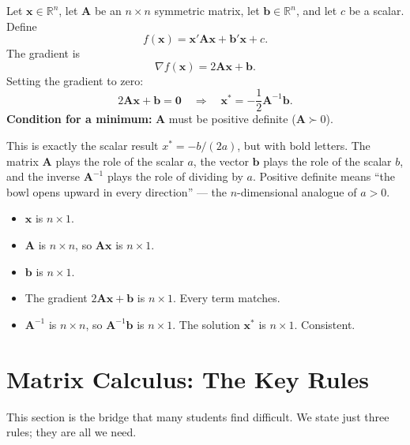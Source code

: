 \documentclass[11pt,a4paper]{article}
\begin{document}
\begin{formaldef}
Let $\bm{x} \in \mathbb{R}^n$, let $\bm{A}$ be an $n \times n$ symmetric matrix, let $\bm{b} \in \mathbb{R}^n$, and let $c$ be a scalar. Define
\[
f(\bm{x}) = \bm{x}'\bm{A}\bm{x} + \bm{b}'\bm{x} + c.
\]
The gradient is
\[
\nabla f(\bm{x}) = 2\bm{A}\bm{x} + \bm{b}.
\]
Setting the gradient to zero:
\[
2\bm{A}\bm{x} + \bm{b} = \bm{0} \quad \Longrightarrow \quad \bm{x}^* = -\frac{1}{2}\bm{A}^{-1}\bm{b}.
\]
\textbf{Condition for a minimum:} $\bm{A}$ must be positive definite ($\bm{A} \succ 0$).
\end{formaldef}

\begin{intuition}
This is exactly the scalar result $x^* = -b/(2a)$, but with bold letters. The matrix $\bm{A}$ plays the role of the scalar $a$, the vector $\bm{b}$ plays the role of the scalar $b$, and the inverse $\bm{A}^{-1}$ plays the role of dividing by $a$. Positive definite means ``the bowl opens upward in every direction'' --- the $n$-dimensional analogue of $a > 0$.
\end{intuition}

\begin{dimcheck}
\begin{itemize}[nosep]
\item $\bm{x}$ is $n \times 1$.
\item $\bm{A}$ is $n \times n$, so $\bm{A}\bm{x}$ is $n \times 1$.
\item $\bm{b}$ is $n \times 1$.
\item The gradient $2\bm{A}\bm{x} + \bm{b}$ is $n \times 1$. Every term matches.
\item $\bm{A}^{-1}$ is $n \times n$, so $\bm{A}^{-1}\bm{b}$ is $n \times 1$. The solution $\bm{x}^*$ is $n \times 1$. Consistent.
\end{itemize}
\end{dimcheck}

\section{Matrix Calculus: The Key Rules}
\label{sec:matrix_calculus}

This section is the bridge that many students find difficult. We state just three rules; they are all we need.
\end{document}
